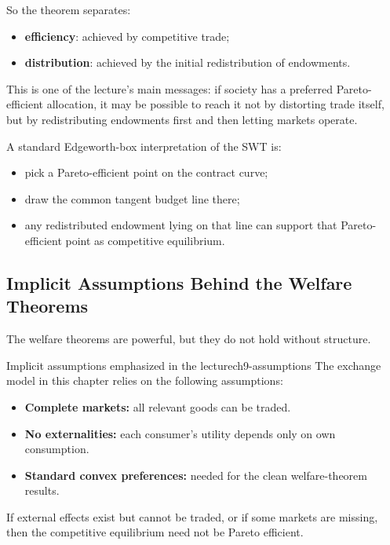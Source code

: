 So the theorem separates:
\begin{itemize}
    \item \textbf{efficiency}: achieved by competitive trade;
    \item \textbf{distribution}: achieved by the initial redistribution of endowments.
\end{itemize}

This is one of the lecture's main messages: if society has a preferred Pareto-efficient allocation, it may be possible to reach it not by distorting trade itself, but by redistributing endowments first and then letting markets operate.

\begin{examtip}
A standard Edgeworth-box interpretation of the SWT is:
\begin{itemize}
    \item pick a Pareto-efficient point on the contract curve;
    \item draw the common tangent budget line there;
    \item any redistributed endowment lying on that line can support that Pareto-efficient point as competitive equilibrium.
\end{itemize}
\end{examtip}

\subsection{Implicit Assumptions Behind the Welfare Theorems}

The welfare theorems are powerful, but they do not hold without structure.

\begin{definition}{Implicit assumptions emphasized in the lecture}{ch9-assumptions}
The exchange model in this chapter relies on the following assumptions:
\begin{itemize}
    \item \textbf{Complete markets:} all relevant goods can be traded.
    \item \textbf{No externalities:} each consumer's utility depends only on own consumption.
    \item \textbf{Standard convex preferences:} needed for the clean welfare-theorem results.
\end{itemize}
\end{definition}

If external effects exist but cannot be traded, or if some markets are missing, then the competitive equilibrium need not be Pareto efficient.

